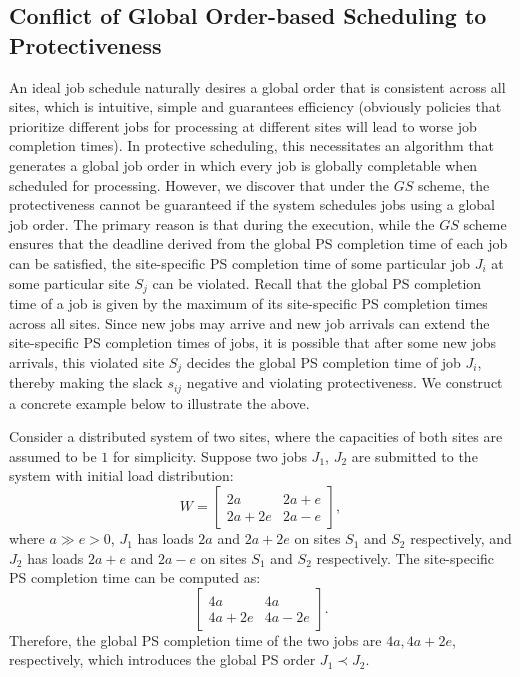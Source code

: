 \subsection{Conflict of Global Order-based Scheduling to Protectiveness}
\label{sec:conflict}
An ideal job schedule naturally desires a global order that is consistent across all sites, which is intuitive, simple and guarantees efficiency (obviously policies that prioritize different jobs for processing at different sites will lead to worse job completion times). In protective scheduling, this necessitates an algorithm that generates a global job order in which every job is globally completable when scheduled for processing. However, we discover that under the $GS$ scheme, the protectiveness cannot be guaranteed if the system schedules jobs using a global job order. The primary reason is that during the execution, while the $GS$ scheme ensures that the deadline derived from the global PS completion time of each job can be satisfied, the site-specific PS completion time of some particular job $J_i$ at some particular site $S_j$ can be violated. Recall that the global PS completion time of a job is given by the maximum of its site-specific PS completion times across all sites. Since new jobs may arrive and new job arrivals can extend the site-specific PS completion times of jobs, it is possible that after some new jobs arrivals, this violated site $S_j$ decides the global PS completion time of job $J_i$, thereby making the slack $s_{ij}$ negative and violating protectiveness. We construct a concrete example below to illustrate the above.%

Consider a distributed system of two sites, where the capacities of both sites are assumed to be $1$ for simplicity. Suppose two jobs $J_1$, $J_2$ are submitted to the system with initial load distribution:
\begin{equation}
    W = \begin{bmatrix} 2a & 2a+e \\ 2a+2e & 2a-e \end{bmatrix},
\end{equation}
where $a \gg e > 0$, $J_1$ has loads $2a$ and $2a+2e$ on sites $S_1$ and $S_2$ respectively, and $J_2$ has loads $2a+e$ and $2a-e$ on sites $S_1$ and $S_2$ respectively. The site-specific PS completion time can be computed as:
\begin{equation}
    \begin{bmatrix} 4a & 4a \\ 4a+2e& 4a-2e \end{bmatrix}.
\end{equation}
Therefore, the global PS completion time of the two jobs are $4a, 4a+2e$, respectively, which introduces the global PS order $J_1 \prec J_2$.

